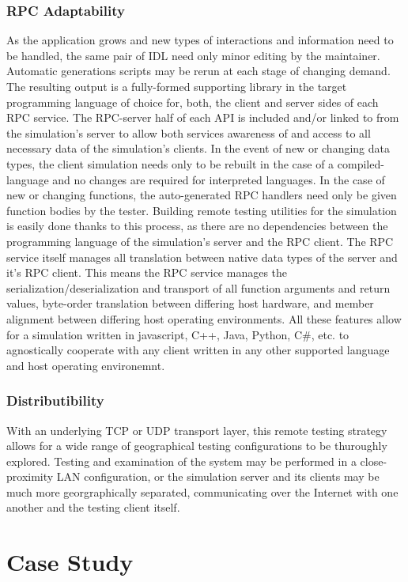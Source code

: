 \documentclass[conference]{IEEEtran}
\begin{document}
\subsubsection{RPC Adaptability}As the application grows and new types of interactions and information need to be handled, the same pair of IDL need only minor editing by the maintainer. Automatic generations scripts may be rerun at each stage of changing demand. The resulting output is a fully-formed supporting library in the target programming language of choice for, both, the client and server sides of each RPC service. The RPC-server half of each API is included and/or linked to from the simulation's server to allow both services awareness of and access to all necessary data of the simulation's clients. In the event of new or changing data types, the client simulation needs only to be rebuilt in the case of a compiled-language and no changes are required for interpreted languages. In the case of new or changing functions, the auto-generated RPC handlers need only be given function bodies by the tester. Building remote testing utilities for the simulation is easily done thanks to this process, as there are no dependencies between the programming language of the simulation's server and the RPC client. The RPC service itself manages all translation between native data types of the server and it's RPC client. This means the RPC service manages the serialization/deserialization and transport of all function arguments and return values, byte-order translation between differing host hardware, and member alignment between differing host operating environments. All these features allow for a simulation written in javascript, C++, Java, Python, C\#, etc. to agnostically cooperate with any client written in any other supported language and host operating environemnt.
\subsubsection{Distributibility}With an underlying TCP or UDP transport layer, this remote testing strategy allows for a wide range of geographical testing configurations to be thuroughly explored. Testing and examination of the system may be performed in a close-proximity LAN configuration, or the simulation server and its clients may be much more georgraphically separated, communicating over the Internet with one another and the testing client itself.

\section{Case Study}
\end{document}
